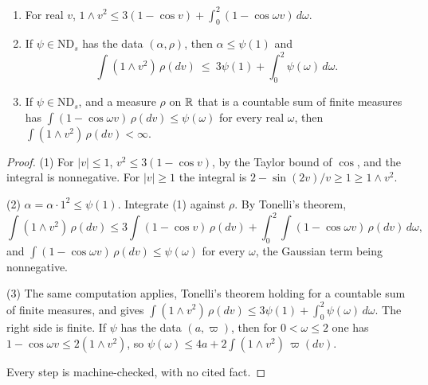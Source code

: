 \begin{lemma}
\label{lem:averaging-bound}

\begin{enumerate}
\item For real $v$, $1 \wedge v^2 \le 3(1 - \cos v) + \int_0^2(1 - \cos\omega v)\,d\omega$.
\item If $\psi \in \mathrm{ND}_s$ has the data $(\alpha, \rho)$, then $\alpha \le \psi(1)$ and
\[
  \int(1 \wedge v^2)\,\rho(dv) \ \le\ 3\psi(1) + \int_0^2\psi(\omega)\,d\omega .
\]
\item If $\psi \in \mathrm{ND}_s$, and a measure $\rho$ on $\mathbb{R}$ that is a countable sum of finite
measures has $\int(1 - \cos\omega v)\,\rho(dv) \le \psi(\omega)$ for every real $\omega$, then
$\int(1 \wedge v^2)\,\rho(dv) < \infty$.
\end{enumerate}
\end{lemma}

\begin{proof}
(1) For $|v| \le 1$, $v^2 \le 3(1 - \cos v)$, by the Taylor bound of $\cos$, and the integral is
nonnegative. For $|v| \ge 1$ the integral is $2 - \sin(2v)/v \ge 1 \ge 1 \wedge v^2$.

(2) $\alpha = \alpha\cdot1^2 \le \psi(1)$. Integrate (1) against $\rho$. By Tonelli's theorem,
\[
  \int(1 \wedge v^2)\,\rho(dv) \le 3\int(1 - \cos v)\,\rho(dv)
  + \int_0^2\int(1 - \cos\omega v)\,\rho(dv)\,d\omega ,
\]
and $\int(1 - \cos\omega v)\,\rho(dv) \le \psi(\omega)$ for every $\omega$, the Gaussian term being
nonnegative.

(3) The same computation applies, Tonelli's theorem holding for a countable sum of finite measures,
and gives $\int(1 \wedge v^2)\,\rho(dv) \le 3\psi(1) + \int_0^2\psi(\omega)\,d\omega$. The right side
is finite. If $\psi$ has the data $(a, \varpi)$, then for $0 < \omega \le 2$ one has
$1 - \cos\omega v \le 2(1 \wedge v^2)$, so $\psi(\omega) \le 4a + 2\int(1 \wedge v^2)\,\varpi(dv)$.

Every step is machine-checked, with no cited fact.
\end{proof}

